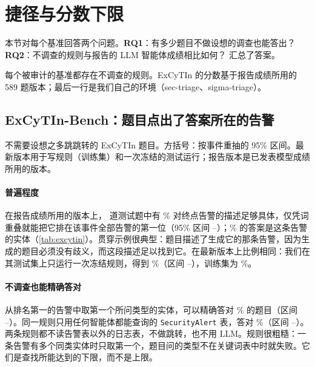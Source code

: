 \section{捷径与分数下限}
\label{sec:floors}

本节对每个基准回答两个问题。\textbf{RQ1}：有多少题目不做设想的调查也能答出？\textbf{RQ2}：不调查的规则与报告的 LLM 智能体成绩相比如何？ 汇总了答案。

\begin{table}[t]
  \caption{每个被审计的基准都存在不调查的规则。ExCyTIn 的分数基于报告成绩所用的 589 题版本；最后一行是我们自己的环境（sec-triage、sigma-triage）。}
  \label{tab:benchmarks}
  \centering\footnotesize
  \begin{adjustbox}{max width=\columnwidth}\end{adjustbox}
\end{table}

\subsection{ExCyTIn-Bench：题目点出了答案所在的告警}
\label{sec:excytin}

\begin{table}[t]
  \caption{不需要设想之多跳跳转的 ExCyTIn 题目。方括号：按事件重抽的 95\% 区间。最新版本用于写规则（训练集）和一次冻结的测试运行；报告版本是已发表模型成绩所用的版本。}
  \label{tab:excytin}
  \centering\footnotesize
  \begin{adjustbox}{max width=\columnwidth}\end{adjustbox}
\end{table}

\paragraph{普遍程度} 在报告成绩所用的版本上，\oN{} 道测试题中有 \oNamed\% 对终点告警的描述足够具体，仅凭词重叠就能把它排在该事件全部告警的第一位（95\% 区间 \oNamedLo--\oNamedHi）；\oAdj\% 的答案是这条告警的实体（\cref{tab:excytin}）。贯穿示例很典型：题目描述了生成它的那条告警，因为生成的题目必须没有歧义，而这段描述足以找到它。在最新版本上比例相同：我们在其测试集上只运行一次冻结规则，得到 \exNamed\%（区间 \exNamedLo--\exNamedHi），训练集为 \exTrainNamed\%。

\paragraph{不调查也能精确答对} 从排名第一的告警中取第一个所问类型的实体，可以精确答对 \oGraph\% 的题目（区间 \oGraphLo--\oGraphHi）。同一规则只用任何智能体都能查询的 \texttt{SecurityAlert} 表，答对 \oTable\%（区间 \oTableLo--\oTableHi）。两条规则都不读告警表以外的日志表，不做跳转，也不用 LLM。规则很粗糙：一条告警有多个同类实体时只取第一个，题目问的类型不在关键词表中时就失败。它们是查找所能达到的下限，而不是上限。

